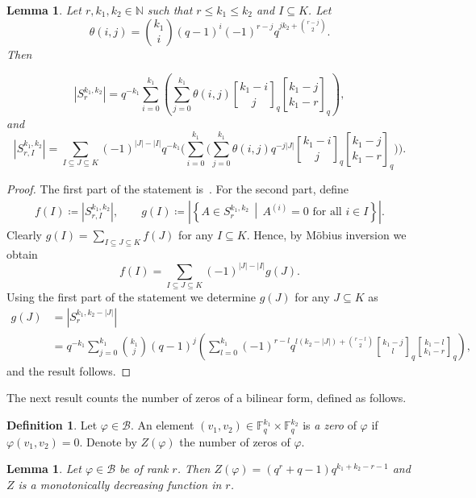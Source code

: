 \documentclass[a4paper,11pt,reqno]{article}
\newcommand{\F}{\mathbb{F}}
\newcommand{\qbinom}[2]{\genfrac[]{0pt}{0}{#1}{#2}}
\theoremstyle{plain} \numberwithin{equation}{section}
\newtheorem{Lemma}[theorem]{Lemma}
\theoremstyle{definition}
\newtheorem{definition}[theorem]{Definition}
\begin{document}
\begin{Lemma} \label{Lemma:vanishmaindiagonal}
Let $r,k_1,k_2\in \mathbb{N}$ such that $r\leq k_1\leq k_2$ and $I\subseteq K$. Let
\[
    \theta(i,j) = \binom{k_1}{i}(q-1)^i(-1)^{r-j}q^{jk_2 + \binom{r-j}{2}}.
\]
Then 

\[
|S^{k_1,k_2}_r| = q^{-k_1}\sum^{k_1}_{i=0} \left(\sum^{k_1}_{j=0}\theta(i,j)\qbinom{k_1-i}{j}_q\qbinom{k_1-j}{k_1-r}_q \right),
\]
and
\[
|S^{k_1,k_2}_{r,I}| =\sum_{I \subseteq J \subseteq K} (-1)^{|J| - |I|} q^{-k_1}\Bigg(\sum^{k_1}_{i=0} \Bigg(\sum^{k_1}_{j=0} \theta(i,j)q^{-j|J|} \qbinom{k_1-i}{j}_q\qbinom{k_1-j}{k_1-r}_q \Bigg)\Bigg).
\]


\end{Lemma}
\begin{proof}
The first part of the statement is~\cite[Corollary~60]{ravagnani2018duality}.
For the second part, define
\begin{align*}
    f(I) \coloneqq |S^{k_1,k_2}_{r,I}|, \qquad
    g(I) \coloneqq \left|\left\{ A\in S_r^{k_1,k_2} \,\middle|\,  A^{(i)} = 0 \text{ for all } i\in I\right\}\right|.
\end{align*}
Clearly $g(I) = \sum_{I\subseteq J \subseteq K} f(J)$ for any $I\subseteq K$. Hence, by Möbius inversion we obtain
\[
f(I) = \sum_{I\subseteq J \subseteq K} (-1)^{|J|-|I|}g(J).
\]
Using the first part of the statement we determine $g(J)$ for any $J\subseteq K$ as \\
\begin{align*}
    g(J) &= |S_r^{k_1,k_2-|J|}|\\  
    &= q^{-k_1} \sum^{k_1}_{j=0}\binom{k_1}{j}(q-1)^j\left( \sum^{k_1}_{l=0}(-1)^{r-l}q^{l(k_2-|J|) + \binom{r-l}{2}} \qbinom{k_1-j}{l}_q \qbinom{k_1-l}{k_1-r}_q \right),
\end{align*}
and the result follows.
\end{proof}



The next result counts the number of zeros of a bilinear form, defined as follows. 

\begin{definition}
    Let $\varphi \in \mathcal{B}$. 
    An element $(v_1, v_2) \in \F_q^{k_1} \times \F_q^{k_2}$ is \emph{a zero} of $\varphi$ if $\varphi(v_1,v_2) = 0$. 
      Denote by $Z(\varphi)$ the number of zeros of $\varphi$. 
\end{definition}



\begin{Lemma} \label{Lemma:zerosbyrank}
    Let $\varphi \in \mathcal{B}$ be of rank $r$. Then $Z(\varphi) = (q^r+q-1)q^{k_1+k_2-r-1}$ and $Z$ is a monotonically decreasing function in $r$.
\end{Lemma}
\end{document}
